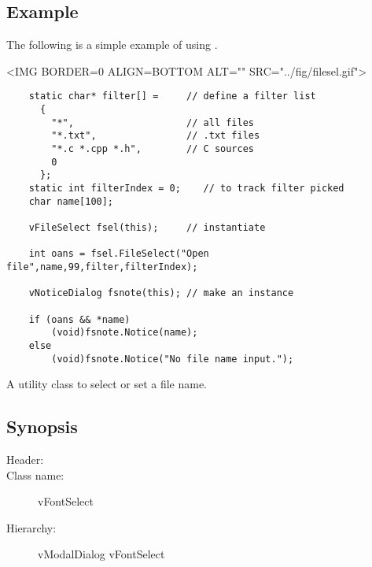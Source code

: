 \subsection*{Example}

The following is a simple example of using .

\vspace{.1in}
\small
\begin{rawhtml}
<IMG BORDER=0 ALIGN=BOTTOM ALT="" SRC="../fig/filesel.gif">
\end{rawhtml}
\begin{latexonly}

\end{latexonly}
\normalfont\normalsize

\footnotesize
\begin{verbatim}
    static char* filter[] =     // define a filter list
      {
        "*",                    // all files
        "*.txt",                // .txt files
        "*.c *.cpp *.h",        // C sources
        0
      };
    static int filterIndex = 0;    // to track filter picked
    char name[100];

    vFileSelect fsel(this);     // instantiate

    int oans = fsel.FileSelect("Open file",name,99,filter,filterIndex);

    vNoticeDialog fsnote(this); // make an instance

    if (oans && *name)
        (void)fsnote.Notice(name);
    else
        (void)fsnote.Notice("No file name input.");
\end{verbatim}
\normalfont\normalsize



A utility class to select or set a file name.

\subsection* {Synopsis}

\begin{description}
        \item [Header:] 
        \item [Class name:] vFontSelect
        \item [Hierarchy:] vModalDialog \rta vFontSelect
\end{description}

